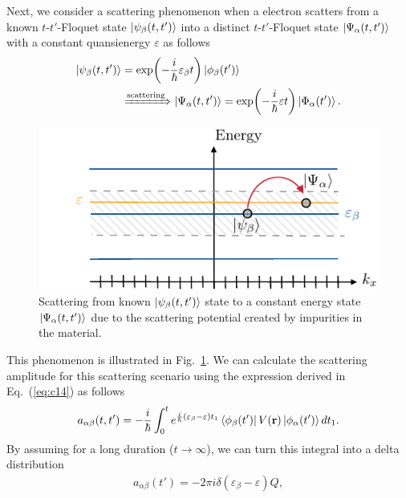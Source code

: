 \documentclass[
 reprint,
 amsmath,amssymb,
 aps,
 prb,
]{revtex4-2}
\begin{document}
Next, we consider a scattering phenomenon when a electron scatters from a known $t$-$t'$-Floquet state $\ket{\psi_{\beta}(t,t')} $ into a distinct $t$-$t'$-Floquet state $\ket{\Psi_{\alpha}(t,t')}$ with a constant quansienergy $\varepsilon$ as follows
\begin{equation} \label{eq:c15}
  \begin{aligned}
  \ket{\psi_{\beta}(t,t')} &= \exp(-\frac{i}{\hbar}\varepsilon_{\beta} t)
  \ket{\phi_{\beta}(t')} \\
  &
  \xRightarrow{\text{scattering}}
  \ket{\Psi_{\alpha}(t,t')} = \exp(-\frac{i}{\hbar}\varepsilon t)
  \ket{\Phi_{\alpha}(t')}.
  \end{aligned}
\end{equation}
\begin{figure}[b]
  \includegraphics[scale=1.0]{fig_6_scattering_scenario.pdf}
  \caption{Scattering from known $\ket{\psi_{\beta}(t,t')}$ state to a constant energy state $\ket{\Psi_{\alpha}(t,t')}$ due to the scattering potential created by impurities in the material.}
  \label{fig:6}
\end{figure}
This phenomenon is illustrated in Fig.~\ref{fig:6}.
We can calculate the scattering amplitude for this scattering scenario using the expression derived in Eq.~(\ref{eq:c14}) as follows
\begin{equation} \label{eq:c16}
  \begin{aligned}
    a_{\alpha\beta}(t,t') =
    -\frac{i}{\hbar}
    \int_{0}^t
    e^{\frac{i}{\hbar}\left(\varepsilon_{\beta} - \varepsilon \right)t_1}
    \bra{\phi_{\beta}(t')}
    V(\vb{r}) \ket{\phi_{\alpha}(t')}  dt_1.
  \end{aligned}
\end{equation}
By assuming for a long duration ($t \rightarrow \infty$), we can turn this integral into a delta distribution
\begin{equation} \label{eq:c17}
  \begin{aligned}
    a_{\alpha\beta}(t') =
    -2\pi i \delta(\varepsilon_{\beta} - \varepsilon)Q,
  \end{aligned}
\end{equation}
\end{document}
